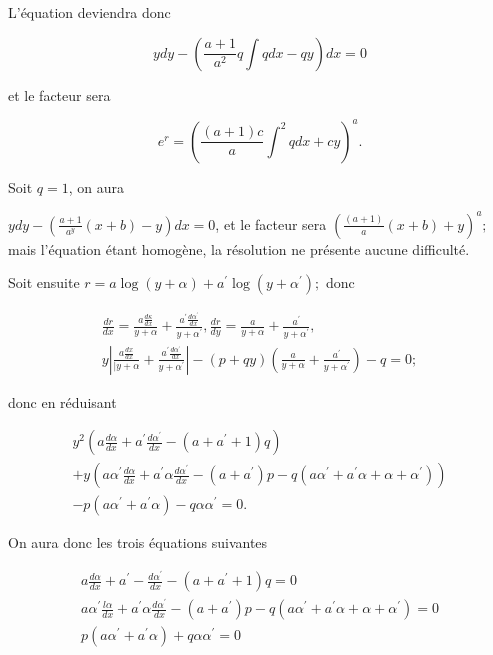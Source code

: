 \documentclass{article}
\begin{document}
L'équation deviendra donc

\[
y d y-\left(\frac{a+1}{a^{2}} q \int q d x-q y\right) d x=0
\]

et le facteur sera

\[
e^{r}=\left(\frac{(a+1) c}{a} \int^{2} q d x+c y\right)^{a} .
\]

Soit \(q=1\), on aura

\(y d y-\left(\frac{a+1}{a^{y}}(x+b)-y\right) d x=0\), et le facteur sera \(\left(\frac{(a+1)}{a}(x+b)+y\right)^{a} ;\) mais l'équation étant homogène, la résolution ne présente aucune difficulté.

Soit ensuite \(r=a \log (y+\alpha)+a^{\prime} \log \left(y+\alpha^{\prime}\right) ;\) donc

\[
\begin{gathered}
\frac{d r}{d x}=\frac{a \frac{d \kappa}{d x}}{y+\alpha}+\frac{a^{\prime} \frac{d \alpha^{\prime}}{d x}}{y+\alpha^{\prime}}, \frac{d r}{d y}=\frac{a}{y+\alpha}+\frac{a^{\prime}}{y+\alpha^{\prime}}, \\
y\left|\frac{a \frac{d x}{d x}}{\mid y+\alpha}+\frac{a^{\prime} \frac{d \alpha^{\prime}}{d x}}{y+\alpha^{\prime}}\right|-(p+q y)\left(\frac{a}{y+\alpha}+\frac{a^{\prime}}{y+\alpha^{\prime}}\right)-q=0 ;
\end{gathered}
\]

donc en réduisant

\[
\begin{gathered}
y^{2}\left(a \frac{d \alpha}{d x}+a^{\prime} \frac{d \alpha^{\prime}}{d x}-\left(a+a^{\prime}+1\right) q\right) \\
+y\left(a \alpha^{\prime} \frac{d \alpha}{d x}+a^{\prime} \alpha \frac{d \alpha^{\prime}}{d x}-\left(a+a^{\prime}\right) p-q\left(a \alpha^{\prime}+a^{\prime} \alpha+\alpha+\alpha^{\prime}\right)\right) \\
-p\left(a \alpha^{\prime}+a^{\prime} \alpha\right)-q \alpha \alpha^{\prime}=0 .
\end{gathered}
\]

On aura donc les trois équations suivantes

\[
\begin{gathered}
a \frac{d \alpha}{d x}+a^{\prime}-\frac{d \alpha^{\prime}}{d x}-\left(a+a^{\prime}+1\right) q=0 \\
a \alpha^{\prime} \frac{l \alpha}{d x}+a^{\prime} \alpha \frac{d \alpha^{\prime}}{d x}-\left(a+a^{\prime}\right) p-q\left(a \alpha^{\prime}+a^{\prime} \alpha+\alpha+\alpha^{\prime}\right)=0 \\
p\left(a \alpha^{\prime}+a^{\prime} \alpha\right)+q \alpha \alpha^{\prime}=0
\end{gathered}
\]
\end{document}
